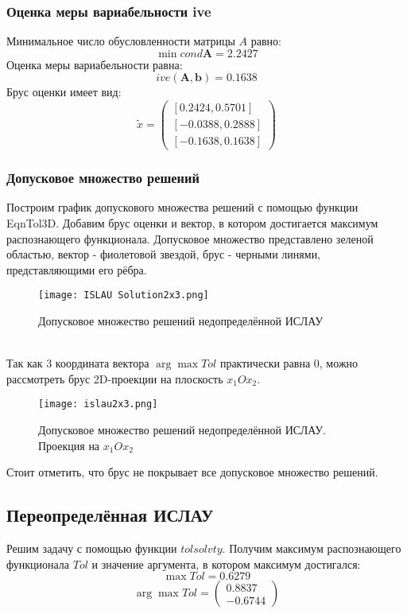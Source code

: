 \subsubsection{Оценка меры вариабельности ive}
Минимальное число обусловленности матрицы $A$ равно:
\begin{equation}
	\min cond \textbf{A} = 2.2427
\end{equation}
Оценка меры вариабельности равна:
\begin{equation}
	ive(\textbf{A}, \textbf{b}) = 0.1638
\end{equation}
Брус оценки имеет вид:
\begin{equation}
	\tilde{x} =
	\begin{pmatrix}
	    [0.2424, 0.5701] \\
		[-0.0388, 0.2888] \\
		[-0.1638, 0.1638]
	\end{pmatrix}
\end{equation}

\subsubsection{Допусковое множество решений}
Построим график допускового множества решений с помощью функции EqnTol3D. Добавим брус оценки и вектор, в котором достигается максимум распознающего функционала. Допусковое множество представлено зеленой областью, вектор - фиолетовой звездой, брус - черными линями, представляющими его рёбра. \\
\begin{figure}[h]
	\centering
	\texttt{[image: ISLAU Solution2x3.png]}
	\caption{Допусковое множество решений недопределённой ИСЛАУ}
\end{figure} \\
Так как 3 координата вектора $\arg \max Tol$ практически равна 0, можно рассмотреть брус 2D-проекции на плоскость $x_1 O x_2$. \\
\newpage
\begin{figure}[h]
	\centering
	\texttt{[image: islau2x3.png]}
	\caption{Допусковое множество решений недопределённой ИСЛАУ. Проекция на $x_1 O x_2$}
\end{figure}
Стоит отметить, что брус не покрывает все допусковое множество решений. \\



\subsection{Переопределённая ИСЛАУ}
Решим задачу с помощью функции $tolsolvty$. Получим максимум распознающего функционала $Tol$ и значение аргумента, в котором максимум достигался:
\begin{equation}
	\max Tol = 0.6279
\end{equation}
\begin{equation}
	\arg \max Tol=
	\begin{pmatrix}
		0.8837 \\
		-0.6744
	\end{pmatrix}
\end{equation}

